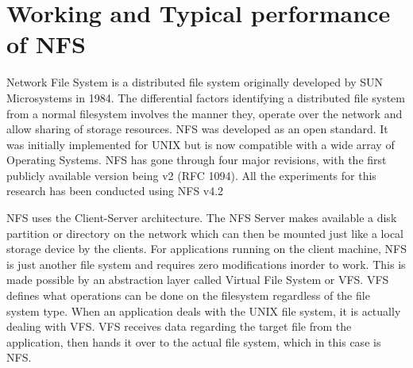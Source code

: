 \documentclass[conference]{IEEEtran}
\begin{document}
\section{Working and Typical performance of NFS}
Network File System is a distributed file system originally developed by
SUN Microsystems in 1984. The differential factors identifying a distributed 
file system from a normal filesystem involves the manner they, operate over the 
network and allow sharing of storage resources. NFS was developed as an open 
standard. It was initially implemented for UNIX but is now compatible with a
wide array of Operating Systems. NFS has gone through four major revisions, 
with the first publicly available version being v2 (RFC 1094). All the 
experiments for this research has been conducted using NFS v4.2

NFS uses the Client-Server architecture. The NFS Server makes available a
disk partition or directory on the network which can then be mounted just
like a local storage device by the clients. For applications running on the
client machine, NFS is just another file system and requires zero
modifications inorder to work. This is made possible by an abstraction
layer called Virtual File System or VFS. VFS defines what operations can be
done on the filesystem regardless of the file system type. When an
application deals with the UNIX file system, it is actually dealing with
VFS. VFS receives data regarding the target file from the application, then
hands it over to the actual file system, which in this case is NFS.
\end{document}
